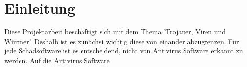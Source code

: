 \section{Einleitung}\label{sec:einleitung}
Diese Projektarbeit beschäftigt sich mit dem Thema 'Trojaner, Viren und Würmer'. Deshalb ist es zunächst wichtig diese von einander abzugrenzen. 
Für jede Schadsoftware ist es entscheidend, nicht von Antivirus Software erkannt zu werden. 
Auf die Antivirus Software 